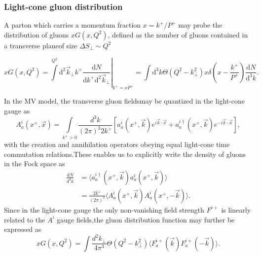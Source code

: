 \subsubsection*{Light-cone gluon distribution}
A parton which carries a momentum fraction $x=k^+/P^+$ may probe the distribution of gluons $xG(x,Q^2)$, defined as the number of gluons contained in a transverse planeof size $\Delta S_\perp\sim Q^2$
\begin{fullwidth}
\begin{equation}\label{glasma25}
    x G\left(x, Q^{2}\right) =\left.\int\limits^{Q^{2}} \mathrm{d}^{2} \vec{k}_{\perp} k^{+} \frac{\mathrm{d} N}{\mathrm{d} k^{+} \mathrm{d}^{2} \vec{k}_\perp}\right|_{k^{+}=x P^{+}}=\int \mathrm{d}^{3} k \Theta\left(Q^{2}-k_{\perp}^{2}\right) x \delta\left(x-\frac{k^{+}}{P^{+}}\right) \frac{\mathrm{d} N}{\mathrm{d}^{3} k}.
\end{equation}
\end{fullwidth}
In the {\sffamily MV} model, the transverse gluon fieldsmay be quantized in the light-cone gauge as
\begin{equation*}
    A_a^{i}\left(x^{+}, \vec{x}\right)=\int\limits_{k^{+}>0} \frac{d^{3} k}{(2 \pi)^{3} 2 k^{+}}\left[a_a^{i}(x^{+}, \vec{k})e^{i \vec{k} \cdot \vec{x}} + a_a^{i \dagger}(x^{+}, \vec{k})e^{-i \vec{k} \cdot \vec{x}}\right],
\end{equation*}
with the creation and annihilation operators obeying equal light-cone time commutation relations.These enables us to explicitly write the density of gluons in the Fock space as
\begin{equation}\label{glasma24}
\begin{aligned}
    \frac{dN}{d^3k}&=\langle a^{i\dag}_a(x^+,\vec{k})a^i_a(x^+,\vec{k})\rangle\\
    &=\frac{2 k^{+}}{(2 \pi)^{3}} \big\langle A_a^i(x^{+}, \vec{k}) A_a^i(x^{+},-\vec{k})\big\rangle.
\end{aligned}
\end{equation}
Since in the light-cone gauge the only non-vanishing field strength $F^{i+}$ is linearly related to the $A^i$ gauge fields,the gluon distribution function may further be expressed as
\begin{equation}\label{glasma26}
    x G\left(x, Q^{2}\right)= \int \frac{d^{2} k_{\perp}}{4\pi^3} \Theta(Q^2-k_\perp^2)\langle F_{a}^{i+}(\vec{k}) F_{a}^{i+}(-\vec{k})\rangle.
\end{equation}

